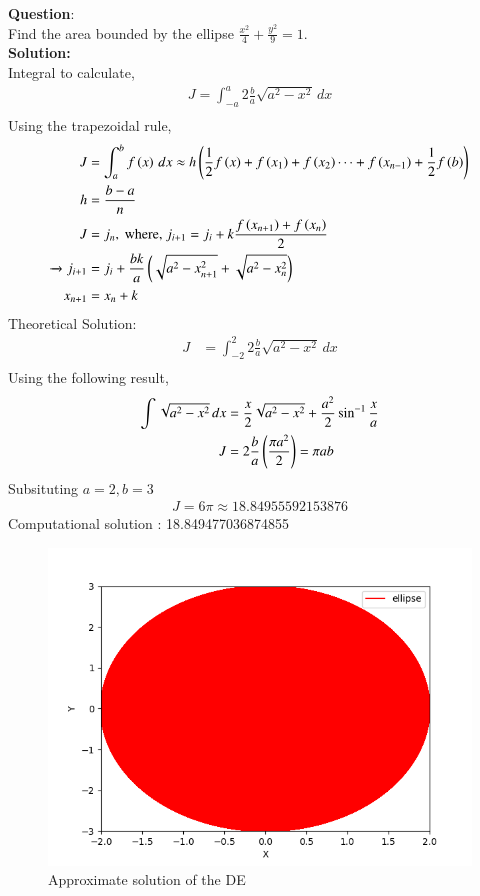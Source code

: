 \documentclass[journal]{IEEEtran}
\begin{document}
\textbf{Question}:\\
Find the area bounded by the ellipse $\frac{x^2}{4} + \frac{y^2}{9} = 1$.
\\
\textbf{Solution: }\\
Integral to calculate, 
\begin{align}
    J = \int_{-a}^{a}  2\frac{b}{a}\sqrt{a^2 - {x}^2} \, dx\\
\end{align}
Using the trapezoidal rule,
\begin{align}
    J &= \int_a^b f\left(x\right)\, dx \approx h\left(\frac{1}{2}f\left(x\right) + f\left(x_1\right) + f\left(x_2\right) \cdots + f\left(x_{n-1}\right) + \frac{1}{2}f\left(b\right)\right)\\
    h &= \frac{b-a}{n}\\
    J &= j_n, \text{ where, } j_{i + 1} = j_i + k\frac{f\left(x_{n+1}\right) + f\left(x_n\right)}{2}\\ 
    \xrightarrow{} j_{i + 1} &= j_i + \frac{bk}{a}\left(\sqrt{a^2 - x_{n+1}^2} + \sqrt{a^2 - x_n^2}\right)\\
    x_{n+1} &= x_n + k
\end{align}
Theoretical Solution:
\begin{align}
    J &= \int_{-2}^{2}  2\frac{b}{a}\sqrt{a^2 - {x}^2} \, dx\\
\end{align}
Using the following result, 
\begin{align}
    \int \sqrt{a^2 - x^2} \, dx &= \frac{x}{2} \sqrt{a^2 - x^2} + \frac{a^2}{2}\sin ^{-1} \frac{x}{a}\\ 
    J &= 2\frac{b}{a} \left(\frac{\pi a^2}{2}\right) = \pi ab
\end{align}
Subsituting $a = 2, b = 3$
\begin{align}
   J = 6\pi \approx 18.84955592153876

\end{align}
Computational solution : 18.849477036874855
\begin{figure}[h!]
   \centering
   \includegraphics[width=0.7\columnwidth]{figs/fig.png}
    \caption{Approximate solution of the DE}
\end{figure}
\end{document}
